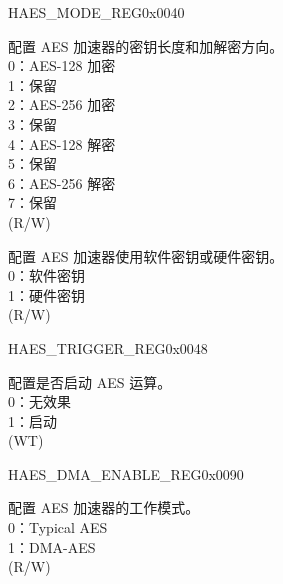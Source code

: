 \begin{register}{H}{AES\_MODE\_REG}{0x0040}\label{regdesc:AESMODEREG}
%
%
%
%
\regnewline%
\begin{regdesc}\begin{reglist}
\label{fielddesc:AESMODE}\item [AES\_MODE] 配置 AES 加速器的密钥长度和加解密方向。\\
0：AES-128 加密\\
1：保留\\
2：AES-256 加密\\
3：保留\\
4：AES-128 解密\\
5：保留\\
6：AES-256 解密\\
7：保留\\
(R/W)
\label{fielddesc:AESUSEHARDWAREKEY}\item [AES\_USE\_HARDWARE\_KEY] 配置 AES 加速器使用软件密钥或硬件密钥。\\
0：软件密钥\\
1：硬件密钥\\ (R/W)
\end{reglist}\end{regdesc}
\end{register}


\begin{register}{H}{AES\_TRIGGER\_REG}{0x0048}\label{regdesc:AESTRIGGERREG}
%
%
\regnewline%
\begin{regdesc}\begin{reglist}
\label{fielddesc:AESTRIGGER}\item [AES\_TRIGGER] 配置是否启动 AES 运算。\\
0：无效果\\
1：启动\\
(WT)
\end{reglist}\end{regdesc}
\end{register}


\begin{register}{H}{AES\_DMA\_ENABLE\_REG}{0x0090}\label{regdesc:AESDMAENABLEREG}
%
%
\regnewline%
\begin{regdesc}\begin{reglist}
\item [AES\_DMA\_ENABLE] 配置 AES 加速器的工作模式。\\
0：Typical AES\\
1：DMA-AES\\
(R/W)
\end{reglist}\end{regdesc}
\end{register}


